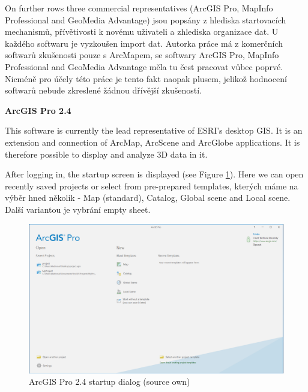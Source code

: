 \documentclass[a4paper,10pt,twoside]{article}
\begin{document}
\noindent On further rows three commercial representatives (ArcGIS Pro, MapInfo Professional and GeoMedia Advantage) jsou popsány z hlediska startovacích mechanismů, přívětivosti k novému uživateli a zhlediska organizace dat. U každého softwaru je vyzkoušen import dat. Autorka práce má z komerčních softwarů zkušenosti pouze s ArcMapem, se softwary ArcGIS Pro, MapInfo Professional and GeoMedia Advantage měla tu čest pracovat vůbec poprvé. Nicméně pro účely této práce je tento fakt naopak plusem, jelikož hodnocení softwarů nebude zkreslené žádnou dřívější zkušeností.

\bigskip

\noindent \textbf {ArcGIS Pro 2.4}

\noindent This software is currently the lead representative of ESRI's desktop GIS. It is an extension and connection of ArcMap, ArcScene and ArcGlobe applications. It is therefore possible to display and analyze 3D data in it.

After logging in, the startup screen is displayed (see Figure \ref{fig:arcgis_startup_screen}). Here we can open recently saved projects or select from pre-prepared templates, kterých máme na výběr hned několik - Map (standard), Catalog, Global scene and Local scene. Další variantou je vybrání empty sheet.

\vspace{0.3cm}
\begin{figure}[hbt!] 
\begin{center}
\includegraphics[width=15cm]{../pictures/arcgis_startup_screen.png} 
\caption[ArcGIS Pro 2.4 startup dialog (source own)]{ArcGIS Pro 2.4 startup dialog (source own)}
\label{fig:arcgis_startup_screen}
\end{center}
\end{figure}
\end{document}
